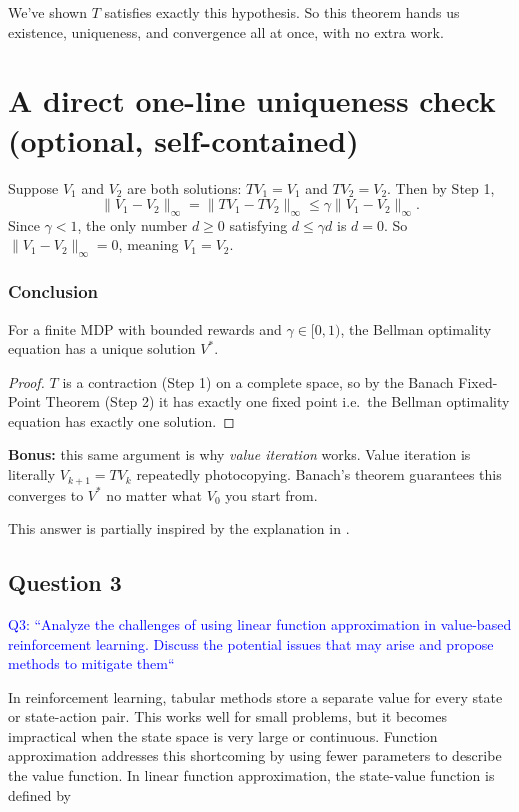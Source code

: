 \documentclass{scrartcl}
\theoremstyle{mytheoremstyle}
\theoremstyle{mytheoremstyle}
\theoremstyle{myproblemstyle}
\begin{document}
We've shown $T$ satisfies exactly this hypothesis. So this theorem hands us existence, uniqueness,
and convergence all at once, with no extra work.

\section*{A direct one-line uniqueness check (optional, self-contained)}

Suppose $V_1$ and $V_2$ are both solutions: $TV_1 = V_1$ and $TV_2 = V_2$. Then by Step 1,
\[
    \|V_1 - V_2\|_\infty = \|TV_1 - TV_2\|_\infty \le \gamma \|V_1-V_2\|_\infty .
\]
Since $\gamma < 1$, the only number $d \ge 0$ satisfying $d \le \gamma d$ is $d=0$. So
$\|V_1-V_2\|_\infty = 0$, meaning $V_1 = V_2$.

\subsubsection*{Conclusion}

\begin{theorem}
    For a finite MDP with bounded rewards and $\gamma \in [0,1)$, the Bellman optimality equation has a
    unique solution $V^*$.
\end{theorem}

\begin{proof}
    $T$ is a contraction (Step 1) on a complete space, so by the Banach Fixed-Point Theorem (Step 2) it
    has exactly one fixed point i.e.\ the Bellman optimality equation has exactly one solution.
\end{proof}

\noindent \textbf{Bonus:} this same argument is why \emph{value iteration} works. Value iteration is
literally $V_{k+1} = TV_k$ repeatedly photocopying. Banach's theorem guarantees this converges to
$V^*$ no matter what $V_0$ you start from.

This answer is partially inspired by the explanation in \cite{salunkhe_bellman_2023}.


\subsection{Question 3}

\textcolor{blue}{Q3: ``Analyze the challenges of using linear function approximation in value-based reinforcement learning. Discuss the potential issues that may arise and propose methods to mitigate them``}

In reinforcement learning, tabular methods store a separate value for every state or state-action pair. This works well for small problems, but it becomes impractical when the state space is very large or continuous. Function approximation addresses this shortcoming by using fewer parameters to describe the value function. In linear function approximation, the state-value function is defined by
\end{document}

